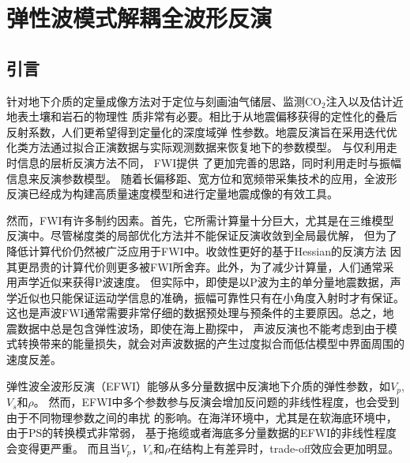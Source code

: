 



\chapter{弹性波模式解耦全波形反演}
\label{cha:MD-EFWI}
\section{引言}
针对地下介质的定量成像方法对于定位与刻画油气储层、监测CO$_2$注入以及估计近地表土壤和岩石的物理性
质非常有必要。相比于从地震偏移获得的定性化的叠后反射系数，人们更希望得到定量化的深度域弹
性参数。地震反演旨在采用迭代优化类方法通过拟合正演数据与实际观测数据来恢复地下的参数模型。
与仅利用走时信息的层析反演方法不同，
FWI提供
了更加完善的思路，同时利用走时与振幅信息来反演参数模型\cite[]{tarantola:1986}。
随着长偏移距、宽方位和宽频带采集技术的应用，全波形反演已经成为构建高质量速度模型和进行定量地震成像的有效工具\cite{virieux2009overview}。

然而，FWI有许多制约因素。首先，它所需计算量十分巨大，尤其是在三维模型反演中。尽管梯度类的局部优化方法并不能保证反演收敛到全局最优解，
但为了降低计算代价仍然被广泛应用于FWI中。收敛性更好的基于Hessian的反演方法\cite{mora:1987,crase1990robust}
因其更昂贵的计算代价则更多被FWI所舍弃。此外，为了减少计算量，人们通常采用声学近似来获得P波速度\cite{ravaut2004multiscale,operto2006crustal}。
但实际中，即使是以P波为主的单分量地震数据，声学近似也只能保证运动学信息的准确，振幅可靠性只有在小角度入射时才有保证。
这也是声波FWI通常需要非常仔细的数据预处理与预条件的主要原因。总之，地震数据中总是包含弹性波场，即使在海上勘探中，
声波反演也不能考虑到由于模式转换带来的能量损失，就会对声波数据的产生过度拟合而低估模型中界面周围的速度反差。

弹性波全波形反演（EFWI）能够从多分量数据中反演地下介质的弹性参数，如$V_p$, $V_s$和$\rho$。
然而，EFWI中多个参数参与反演会增加反问题的非线性程度，也会受到由于不同物理参数之间的串扰
的影响\cite{forgues.lambare:1997}。在海洋环境中，尤其是在软海底环境中，由于PS的转换模式非常弱，
基于拖缆或者海底多分量数据的EFWI的非线性程度会变得更严重\cite{sears2008}。
而且当$V_p$，$V_s$和$\rho$在结构上有差异时，trade-off效应会更加明显。

